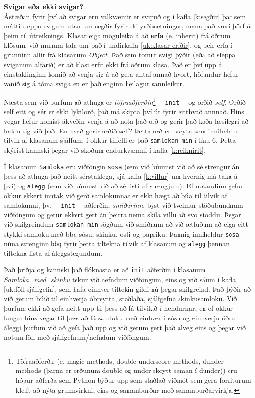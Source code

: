 \begin{itarefni}
\textbf{Svigar eða ekki svigar?}\\
Ástæðan fyrir því að svigar eru valkvæmir er svipuð og í kafla \ref{k:segðir} þar sem mátti sleppa svigum utan um segðir fyrir skilyrðissetningar, nema það væri þörf á þeim til útreiknings.
Klasar eiga möguleika á að \textbf{erfa} (e. inherit) frá öðrum klösum, við munum tala um það í undirkafla \ref{uk:klasar-erfðir}, og þeir erfa í grunninn allir frá klasanum \textit{Object}.
Það sem tómur svigi þýðir (eða að sleppa sviganum alfarið) er að klasi erfir ekki frá öðrum klasa.
Það er því upp á einstaklinginn komið að venja sig á að gera alltaf annað hvort, höfundur hefur vanið sig á tóma sviga en er það enginn heilagur sannleikur.
\end{itarefni}

Næsta sem við þurfum að athuga er \emph{töfraaðferðin}\footnote{Töfraaðferðir (e. magic methods, double underscore methods, dunder methods (þarna er orðunum double og under skeytt saman í dunder)) eru hópur aðferða sem Python býður upp sem staðlað viðmót sem gera forriturum kleift að nýta grunnvirkni, eins og samanburður með samanburðarvirkja.} \texttt{\_\_init\_\_} og orðið \emph{self}.
Orðið self eitt og sér er ekki lykilorð, það má skipta því út fyrir eitthvað annnað.
Hins vegar hefur komist ákveðin venja á að nota það orð og gerir það kóða læsilegri að halda sig við það.
En hvað gerir orðið self?
Þetta orð er breyta sem inniheldur tilvik af klasanum sjálfum, í okkar tilfelli er það \texttt{samlokan\_min} í línu 6.
Þetta skýrist kannski þegar við skoðum endurkvæmni í kafla \ref{k:reiknirit}.

Í klasanum \texttt{Samloka} eru viðföngin \texttt{sosa} (sem við búumst við að sé strengur án þess að athuga það neitt sérstaklega, sjá kafla \ref{k:villur} um hvernig má taka á því) og \texttt{alegg} (sem við búumst við að sé listi af strengjum).
Ef notandinn gefur okkur ekkert inntak við gerð samlokunnar er ekki hægt að búa til tilvik af samlokunni, því \texttt{\_\_init\_\_} aðferðin, \emph{smiðurinn}, býst við tveimur stöðubundnum viðföngum og getur ekkert gert án þeirra nema skila villu að svo stöddu.
Þegar við skilgreindum \texttt{samlokan\_min} sögðum við smiðnum að við ætluðum að eiga eitt stykki samloku með bbq sósu, skinku, osti og papriku.
Þannig inniheldur \texttt{sosa} núna strenginn \texttt{bbq} fyrir þetta tiltekna tilvik af klasanum og \texttt{alegg} þennan tiltekna lista af áleggstegundum.

Það þriðja og kannski það flóknasta er að \texttt{init} aðferðin í klasanum \textit{Samloka\_med\_skinku} tekur við nefndum viðföngum, eins og við sáum í kafla \ref{uk:föll-sjálfgefin}, sem hafa einhver tiltekin gildi nú þegar skilgreind.
Það þýðir að við getum búið til einhverja óbreytta, staðlaða, sjálfgefna skinkusamloku.
Við þurfum ekki að gefa neitt upp til þess að fá tilvikið í hendurnar, en ef okkur langar hins vegar til þess að fá samloku með einhverri sósu og einhverju öðru áleggi þurfum við að gefa það upp og við getum gert það alveg eins og þegar við notum föll með sjálfgefnum/nefndum viðföngum.

